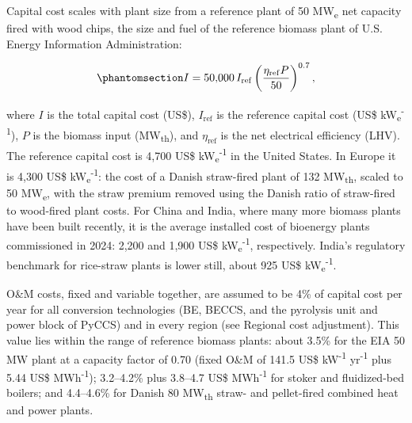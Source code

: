 \documentclass[
  letterpaper,
  twoside,
  twocolumn,
  9pt]{article}
\begin{document}
Capital cost scales with plant size from a reference plant of 50
MW\textsubscript{e} net capacity fired with wood chips, the size and
fuel of the reference biomass plant of U.S. Energy Information
Administration\citep{eia2026}:

\begin{equation}\phantomsection\label{eq-capex}{I = 50{,}000\, I_{\mathrm{ref}} \left( \frac{\eta_{\mathrm{ref}} P}{50} \right)^{0.7},}\end{equation}

where \(I\) is the total capital cost (US\$), \(I_{\mathrm{ref}}\) is
the reference capital cost (US\$
kW\textsubscript{e}\textsuperscript{-1}), \(P\) is the biomass input
(MW\textsubscript{th}), and \(\eta_{\mathrm{ref}}\) is the net
electrical efficiency (LHV). The reference capital cost is 4,700 US\$
kW\textsubscript{e}\textsuperscript{-1} in the United
States.\citep{eia2026} In Europe it is 4,300 US\$
kW\textsubscript{e}\textsuperscript{-1}: the cost of a Danish
straw-fired plant of 132 MW\textsubscript{th},\citep{dea2020} scaled to
50 MW\textsubscript{e}, with the straw premium removed using the Danish
ratio of straw-fired to wood-fired plant costs. For China and India,
where many more biomass plants have been built recently, it is the
average installed cost of bioenergy plants commissioned in 2024: 2,200
and 1,900 US\$ kW\textsubscript{e}\textsuperscript{-1},
respectively.\citep{irena2025} India's regulatory benchmark for
rice-straw plants is lower still, about 925 US\$
kW\textsubscript{e}\textsuperscript{-1}.\citep{cerc2024}

O\&M costs, fixed and variable together, are assumed to be 4\% of
capital cost per year for all conversion technologies (BE, BECCS, and
the pyrolysis unit and power block of PyCCS) and in every region (see
Regional cost adjustment). This value lies within the range of reference
biomass plants: about 3.5\% for the EIA 50 MW plant at a capacity factor
of 0.70 (fixed O\&M of 141.5 US\$ kW\textsuperscript{-1}
yr\textsuperscript{-1} plus 5.44 US\$
MWh\textsuperscript{-1});\citep{eia2023} 3.2--4.2\% plus 3.8--4.7 US\$
MWh\textsuperscript{-1} for stoker and fluidized-bed
boilers;\citep{irena2012} and 4.4--4.6\% for Danish 80
MW\textsubscript{th} straw- and pellet-fired combined heat and power
plants.\citep{dea2020}
\end{document}
